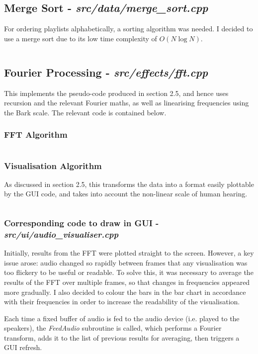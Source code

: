 \pagebreak
\subsection{Merge Sort - \textit{src/data/merge\_sort.cpp}}
For ordering playlists alphabetically, a sorting  algorithm was needed. I decided to use a merge sort due to its low time complexity of \(O(N \log{N})\).
\inputminted[linenos]{c++}{../src/data/merge_sort.cpp}

\pagebreak
\subsection{Fourier Processing - \textit{src/effects/fft.cpp}}
This implements the pseudo-code produced in section 2.5, and hence uses recursion and the relevant Fourier maths, as well as linearising frequencies using the Bark scale. The relevant code is contained below.

\subsubsection{FFT Algorithm}
\inputminted[linenos, firstline=1, lastline=79]{c++}{../src/effects/fft.cpp}

\pagebreak
\subsubsection{Visualisation Algorithm}
As discussed in section 2.5, this transforms the data into a format easily plottable by the GUI code, and takes into account the non-linear scale of human hearing.
\inputminted[linenos, firstline=81, lastline=148]{c++}{../src/effects/fft.cpp}

\pagebreak
\subsubsection{Corresponding code to draw in GUI - \textit{src/ui/audio\_visualiser.cpp}}
Initially, results from the FFT were plotted straight to the screen. However, a key issue arose: audio changed so rapidly between frames that any visualisation was too flickery to be useful or readable.  To solve this, it was necessary to average the results of the FFT over multiple frames, so that changes in frequencies appeared more gradually. I also decided to colour the bars in the bar chart in accordance with their frequencies in order to increase the readability of the visualisation.

Each time a fixed buffer of audio is fed to the audio device (i.e. played to the speakers), the \textit{FeedAudio} subroutine is called, which performs a Fourier transform, adds it to the list of previous results for averaging, then triggers a GUI refresh.
\inputminted[linenos, firstline=15, lastline=44]{c++}{../src/ui/audio_visualiser.cpp}
\inputminted[linenos, firstline=67, lastline=165]{c++}{../src/ui/audio_visualiser.cpp}

